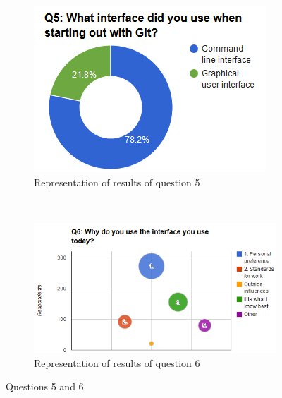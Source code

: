 \documentclass[a4paper,oneside]{bth} %
\begin{document}
		\begin{figure}[H]
			\centering
			\begin{subfigure}[b]{0.45\textwidth}
				\includegraphics[width=\textwidth]{graphs/q5.png}
				\caption{Representation of results of question 5}
				\label{fig:q5}
			\end{subfigure}
			~
			\begin{subfigure}[b]{0.45\textwidth}
				\includegraphics[width=\textwidth]{graphs/q6.png}
				\caption{Representation of results of question 6}
				\label{fig:q6}
			\end{subfigure}
			\caption{Questions 5 and 6}\label{fig:q5-q6}
		\end{figure}
\end{document}
